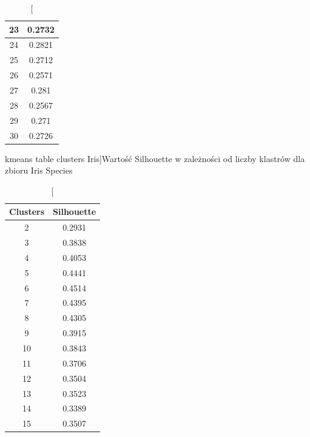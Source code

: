 \documentclass{classrep}
\begin{document}
{{\begin{table}[!htbp]
\begin{minipage}{.24\textwidth}
\begin{tabular}{|c|c|}
                        23 & 0.2732 \\ \hline
                        24 & 0.2821 \\ \hline
                        25 & 0.2712 \\ \hline
                        26 & 0.2571 \\ \hline
                        27 & 0.281 \\ \hline
                        28 & 0.2567 \\ \hline
                        29 & 0.271 \\ \hline
                        30 & 0.2726 \\ \hline
                    \end{tabular}
                    \caption
                    [kmeans table clusters Iris]{Wartość Silhouette w zależności od
                    liczby klastrów dla zbioru Iris Species}
                    \label{kmeans_table_clusters_Iris}
                \end{minipage}
                \hfill
                \begin{minipage}{.24\textwidth}
                    \centering
                    \begin{tabular}{|c|c|}
                        \hline
                        Clusters & Silhouette \\ \hline
                        2 & 0.2931 \\ \hline
                        3 & 0.3838 \\ \hline
                        4 & 0.4053 \\ \hline
                        5 & 0.4441 \\ \hline
                        6 & 0.4514 \\ \hline
                        7 & 0.4395 \\ \hline
                        8 & 0.4305 \\ \hline
                        9 & 0.3915 \\ \hline
                        10 & 0.3843 \\ \hline
                        11 & 0.3706 \\ \hline
                        12 & 0.3504 \\ \hline
                        13 & 0.3523 \\ \hline
                        14 & 0.3389 \\ \hline
                        15 & 0.3507 \\ \hline

\end{tabular}
\end{minipage}
\end{table}}}
\end{document}
